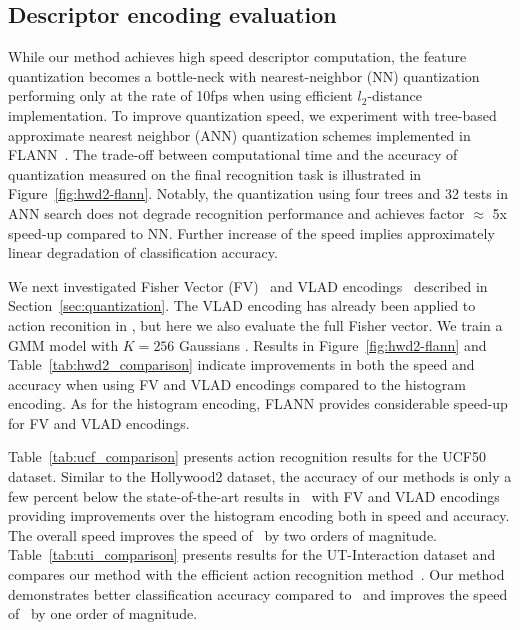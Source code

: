 \documentclass[10pt,twocolumn,letterpaper]{article}
\begin{document}
\subsection{Descriptor encoding evaluation}
\label{subsec:descencimprov}
While our method achieves high speed descriptor computation, the feature quantization becomes a bottle-neck with nearest-neighbor (NN) quantization performing only at the rate of 10fps when using efficient $l_2$-distance implementation. To improve quantization speed, we experiment with tree-based approximate nearest neighbor (ANN) quantization schemes implemented in FLANN~\cite{Muja09}. The trade-off between computational time and the accuracy of quantization measured on the final recognition task is illustrated in Figure~\ref{fig:hwd2-flann}. Notably, the quantization using four trees and 32 tests in ANN search does not degrade recognition performance and achieves factor $\approx$ 5x speed-up compared to NN. Further increase of the speed implies approximately linear degradation of classification accuracy. 

We next investigated Fisher Vector (FV)~\cite{Perronnin12} and VLAD encodings~\cite{Jegou10} described in Section~\ref{sec:quantization}. 
%
The VLAD encoding has already been applied to action reconition in \cite{Jain13}, but here we also evaluate the full Fisher vector. We train a GMM model with $K=256$ Gaussians \cite{Jegou12}. Results in Figure~\ref{fig:hwd2-flann} and Table~\ref{tab:hwd2_comparison} indicate improvements in both the speed and accuracy when using FV and VLAD encodings compared to the histogram encoding. As for the histogram encoding, FLANN provides considerable speed-up for FV and VLAD encodings.

Table~\ref{tab:ucf_comparison} presents action recognition results for the UCF50 dataset. Similar to the Hollywood2 dataset, the accuracy of our methods is only a few percent below the state-of-the-art results in~\cite{Wang12} with FV and VLAD encodings providing improvements over the histogram encoding both in speed and accuracy. The overall speed improves the speed of~\cite{Wang12} by two orders of magnitude. Table~\ref{tab:uti_comparison} presents results for the UT-Interaction dataset and compares our method with the efficient action recognition method~\cite{Yu10}. Our method demonstrates better classification accuracy compared to~\cite{Yu10} and improves the speed of~\cite{Yu10} by one order of magnitude. %
\end{document}
